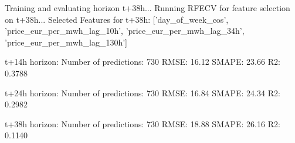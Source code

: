 Training and evaluating horizon t+38h...
Running RFECV for feature selection on t+38h...
Selected Features for t+38h: ['day_of_week_cos', 'price_eur_per_mwh_lag_10h', 'price_eur_per_mwh_lag_34h', 'price_eur_per_mwh_lag_130h']

t+14h horizon:
Number of predictions: 730
RMSE: 16.12
SMAPE: 23.66%
R2: 0.3788

t+24h horizon:
Number of predictions: 730
RMSE: 16.84
SMAPE: 24.34%
R2: 0.2982

t+38h horizon:
Number of predictions: 730
RMSE: 18.88
SMAPE: 26.16%
R2: 0.1140
